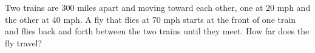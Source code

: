 Two trains are $300$ miles apart and moving toward each other, one at $20$ mph and the other at $40$ mph. A fly that flies at $70$ mph starts at the front of one train and flies back and forth between the two trains until they meet. How far does the fly travel?
